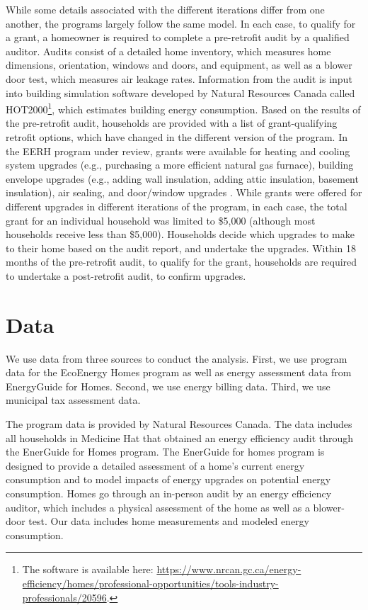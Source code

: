 \documentclass{article}
\begin{document}
While some details associated with the different iterations differ from one another, the programs largely follow the same model. In each case, to qualify for a grant, a homeowner is required to complete a pre-retrofit audit by a qualified auditor. Audits consist of a detailed home inventory, which measures home dimensions, orientation, windows and doors, and equipment, as well as a blower door test, which measures air leakage rates. Information from the audit is input into building simulation software developed by Natural Resources Canada called HOT2000\footnote{The software is available here: \url{https://www.nrcan.gc.ca/energy-efficiency/homes/professional-opportunities/tools-industry-professionals/20596}.}, which estimates building energy consumption. Based on the results of the pre-retrofit audit, households are provided with a list of grant-qualifying retrofit options, which have changed in the different version of the program. In the EERH program under review, grants were available for heating and cooling system upgrades (e.g., purchasing a more efficient natural gas furnace), building envelope upgrades (e.g., adding wall insulation, adding attic insulation, basement insulation), air sealing, and door/window upgrades \citep{canada2009granttable}. While grants were offered for different upgrades in different iterations of the program, in each case, the total grant for an individual household was limited to \$5,000 (although most households receive less than \$5,000). Households decide which upgrades to make to their home based on the audit report, and undertake the upgrades. Within 18 months of the pre-retrofit audit, to qualify for the grant, households are required to undertake a post-retrofit audit, to confirm upgrades.


\section{Data}\label{sec:dat}
We use data from three sources to conduct the analysis. First, we use program data for the EcoEnergy Homes program as well as energy assessment data from EnergyGuide for Homes. Second, we use energy billing data. Third, we use municipal tax assessment data.

The program data is provided by Natural Resources Canada. The data includes all households in Medicine Hat that obtained an energy efficiency audit through the EnerGuide for Homes program. The EnerGuide for homes program is designed to provide a detailed assessment of a home's current energy consumption and to model impacts of energy upgrades on potential energy consumption. Homes go through an in-person audit by an energy efficiency auditor, which includes a physical assessment of the home as well as a blower-door test. Our data includes home measurements and modeled energy consumption.
\end{document}
